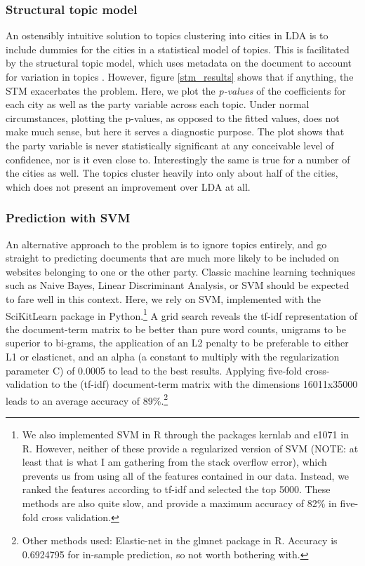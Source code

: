 \documentclass[11pt]{article}
\begin{document}
\subsubsection{Structural topic model}
An ostensibly intuitive solution to topics clustering into cities in LDA is to include dummies for the cities in a statistical model of topics. This is facilitated by the structural topic model, which uses metadata on the document to account for variation in topics \citep{Roberts2014}. However, figure \ref{stm_results} shows that if anything, the STM exacerbates the problem. Here, we plot the \textit{p-values} of the coefficients for each city as well as the party variable across each topic. Under normal circumstances, plotting the p-values, as opposed to the fitted values, does not make much sense, but here it serves a diagnostic purpose. The plot shows that the party variable is never statistically significant at any conceivable level of confidence, nor is it even close to. Interestingly the same is true for a number of the cities as well. The topics cluster heavily into only about half of the cities, which does not present an improvement over LDA at all.

\subsubsection{Prediction with SVM}
An alternative approach to the problem is to ignore topics entirely, and go straight to predicting documents that are much more likely to be included on websites belonging to one or the other party. Classic machine learning techniques such as Naive Bayes, Linear Discriminant Analysis, or SVM should be expected to fare well in this context. Here, we rely on SVM, implemented with the SciKitLearn package in Python.\footnote{We also implemented SVM in R through the packages kernlab and e1071 in R. However, neither of these provide a regularized version of SVM (NOTE: at least that is what I am gathering from the stack overflow error), which prevents us from using all of the features contained in our data. Instead, we ranked the features according to tf-idf and selected the top 5000. These methods are also quite slow, and provide a maximum accuracy of 82\% in five-fold cross validation.} A grid search reveals the tf-idf representation of the document-term matrix to be better than pure word counts, unigrams to be superior to bi-grams, the application of an L2 penalty to be preferable to either L1 or elasticnet, and an alpha (a constant to multiply with the regularization parameter C) of 0.0005 to lead to the best results. Applying five-fold cross-validation to the (tf-idf) document-term matrix with the dimensions 16011x35000 leads to an average accuracy of 89\%.\footnote{Other methods used: Elastic-net in the glmnet package in R. Accuracy is 0.6924795 for in-sample prediction, so not worth bothering with.}
\end{document}
